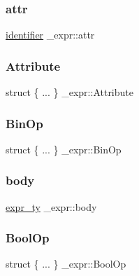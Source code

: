 \mbox{\label{struct__expr_a4ec9e1c3971aa7ab34c5da29455342b4}} 
\subsubsection{\texorpdfstring{attr}{attr}}
{\footnotesize\ttfamily \mbox{\hyperlink{asdl_8h_a78ca2081e230a95abc88c411c9816775}{identifier}} \+\_\+expr\+::attr}

\mbox{\label{struct__expr_a1cd294594ad301ad1b4b83970eb10fb2}} 
\subsubsection{\texorpdfstring{Attribute}{Attribute}}
{\footnotesize\ttfamily struct \{ ... \}   \+\_\+expr\+::\+Attribute}

\mbox{\label{struct__expr_a4cbecab88058a5bca34c881a2b484c06}} 
\subsubsection{\texorpdfstring{BinOp}{BinOp}}
{\footnotesize\ttfamily struct \{ ... \}   \+\_\+expr\+::\+Bin\+Op}

\mbox{\label{struct__expr_a615d836f0f8ca5f284023f2683efdeb2}} 
\subsubsection{\texorpdfstring{body}{body}}
{\footnotesize\ttfamily \mbox{\hyperlink{_python-ast_8h_a56d3705e020a071405094a220c4592bd}{expr\+\_\+ty}} \+\_\+expr\+::body}

\mbox{\label{struct__expr_aa9cc1426a014c668556d1ea584837cca}} 
\subsubsection{\texorpdfstring{BoolOp}{BoolOp}}
{\footnotesize\ttfamily struct \{ ... \}   \+\_\+expr\+::\+Bool\+Op}

